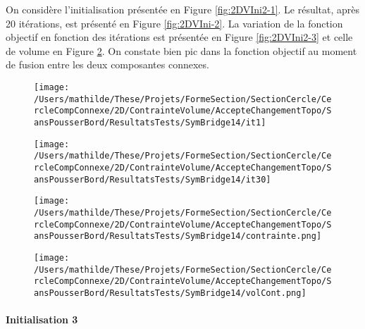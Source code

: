 \documentclass[11pt,a4paper]{article}
\begin{document}
\vspace{0cm}

On considère l'initialisation présentée en Figure \ref{fig:2DVIni2-1}. Le résultat, après 20 itérations, est présenté en Figure \ref{fig:2DVIni-2}. La variation de la fonction objectif en fonction des itérations est présentée en Figure \ref{fig:2DVIni2-3} et celle de volume en Figure \ref{fig:2DVIni2-4}. On constate bien pic dans la fonction objectif au moment de fusion entre les deux composantes connexes.

\begin{figure}[H]
	\begin{minipage}{0.48\textwidth}
		\centering
		\texttt{[image: /Users/mathilde/These/Projets/FormeSection/SectionCercle/CercleCompConnexe/2D/ContrainteVolume/AccepteChangementTopo/SansPousserBord/ResultatsTests/SymBridge14/it1]}
		\label{fig:2DVIni2-1}
	\end{minipage}
	\begin{minipage}{0.48\textwidth}
		\centering
		\texttt{[image: /Users/mathilde/These/Projets/FormeSection/SectionCercle/CercleCompConnexe/2D/ContrainteVolume/AccepteChangementTopo/SansPousserBord/ResultatsTests/SymBridge14/it30]}
		\label{fig:2DVIni2-2}
	\end{minipage}
\end{figure}

\begin{figure}[H]
	\begin{minipage}{0.48\textwidth}
		\centering
		\texttt{[image: /Users/mathilde/These/Projets/FormeSection/SectionCercle/CercleCompConnexe/2D/ContrainteVolume/AccepteChangementTopo/SansPousserBord/ResultatsTests/SymBridge14/contrainte.png]}
		\label{fig:2DVIni2-3}
	\end{minipage}
	\begin{minipage}{0.48\textwidth}
		\centering
		\texttt{[image: /Users/mathilde/These/Projets/FormeSection/SectionCercle/CercleCompConnexe/2D/ContrainteVolume/AccepteChangementTopo/SansPousserBord/ResultatsTests/SymBridge14/volCont.png]}
		\label{fig:2DVIni2-4}
	\end{minipage}
\end{figure}

\paragraph{Initialisation 3}

\vspace{0cm}
\end{document}
